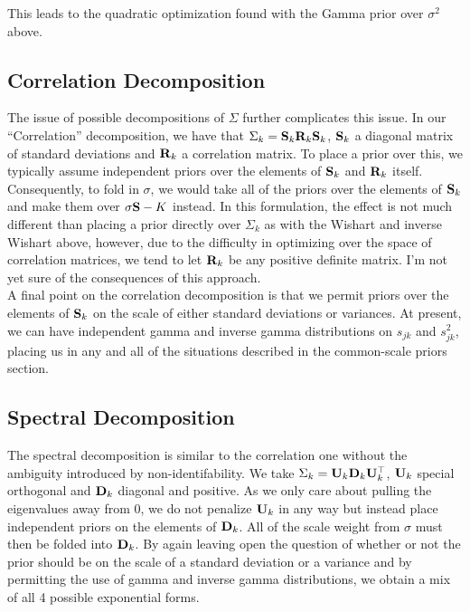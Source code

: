 \documentclass[10pt]{article}
\begin{document}
\noindent This leads to the quadratic optimization found with the
Gamma prior over $\sigma^2$ above.

\subsection*{Correlation Decomposition}

The issue of possible decompositions of $\Sigma$ further complicates
this issue. In our ``Correlation'' decomposition, we have
that $\Sigma_k = {\bf S}_k{\bf R}_k{\bf S}_k$, ${\bf S}_k$ a diagonal matrix of standard
deviations and ${\bf R}_k$ a correlation matrix. To place a prior over
this, we typically assume independent priors over the elements of
${\bf S}_k$ and ${\bf R}_k$ itself. Consequently, to fold in $\sigma$, we
would take all of the priors over the elements of ${\bf S}_k$ and make
them over $\sigma{\bf S}-K$ instead. In this formulation, the effect is
not much different than placing a prior directly over $\Sigma_k$ as with
the Wishart and inverse Wishart above, however, due to the difficulty
in optimizing over the space of correlation matrices, we tend to let
${\bf R}_k$ be any positive definite matrix. I'm not yet sure of the
consequences of this approach. \\

A final point on the correlation decomposition is that we permit
priors over the elements of ${\bf S}_k$ on the scale of either standard
deviations or variances. At present, we can have independent gamma and inverse
gamma distributions on $s_{jk}$ and $s_{jk}^2$, placing us in any and
all of the situations described in the common-scale priors section.

\subsection*{Spectral Decomposition}

The spectral decomposition is similar to the correlation one without
the ambiguity introduced by non-identifability. We take
$\Sigma_k = {\bf U}_k{\bf D}_k{\bf U}_k^\top$, ${\bf U}_k$ special
orthogonal and ${\bf D}_k$ diagonal and positive. As we only care
about pulling the eigenvalues away from $0$, we do not penalize ${\bf
  U}_k$ in any way but instead place independent priors on the
elements of ${\bf D}_k$. All of the scale weight from $\sigma$
must then be folded into ${\bf D}_k$. By again leaving open the
question of whether or not the prior should be on the scale of a
standard deviation or a variance and by permitting the use of gamma
and inverse gamma distributions, we obtain a mix of all 4 possible
exponential forms.
\end{document}
